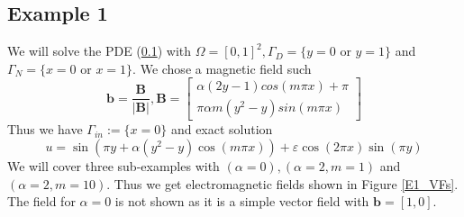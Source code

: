 \documentclass[12pt,a4paper]{article}
\begin{document}
\subsection{Example 1}
We will solve the PDE (\ref{}) with $\Omega = [0,1]^2, \Gamma_D = \{y=0 \text{ or } y=1\}$ and $\Gamma_N = \{x=0 \text{ or } x=1\}$. We chose a magnetic field such
\begin{equation} \label{E1_b}
\mathbf{b} = \frac{\mathbf{B}}{|\mathbf{B}|}, 
\mathbf{B} = \left[ \begin{matrix}
\alpha(2y-1)cos(m\pi x) + \pi\\
\pi \alpha m (y^2-y)sin(m \pi x)
\end{matrix} \right]
\end{equation}
Thus we have $\Gamma_{in} := \{x=0\}$ and exact solution
\begin{equation} \label{E1_u}
u = \sin(\pi y + \alpha (y^2-y) \cos(m\pi x)) + \varepsilon \cos(2 \pi x) \sin(\pi y)
\end{equation}
We will cover three sub-examples with $(\alpha=0),(\alpha=2,m=1)$ and $(\alpha = 2, m=10)$. Thus we get electromagnetic fields  shown in Figure \ref{E1_VFs}. The field for $\alpha = 0$ is not shown as it is a simple vector field with $\mathbf{b}= [1, 0]$.
\end{document}
